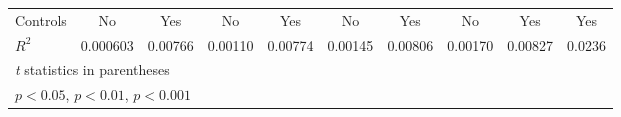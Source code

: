 {\begin{tabular}{l*{9}{c}}
Controls        &       No         &      Yes         &       No         &      Yes         &       No         &      Yes         &       No         &      Yes         &      Yes         \\
$ R^2 $         & 0.000603         &  0.00766         &  0.00110         &  0.00774         &  0.00145         &  0.00806         &  0.00170         &  0.00827         &   0.0236         \\
\hline\hline
\multicolumn{10}{l}{\footnotesize \textit{t} statistics in parentheses}\\
\multicolumn{10}{l}{\footnotesize \sym{*} \(p<0.05\), \sym{**} \(p<0.01\), \sym{***} \(p<0.001\)}\\
\end{tabular}
}
